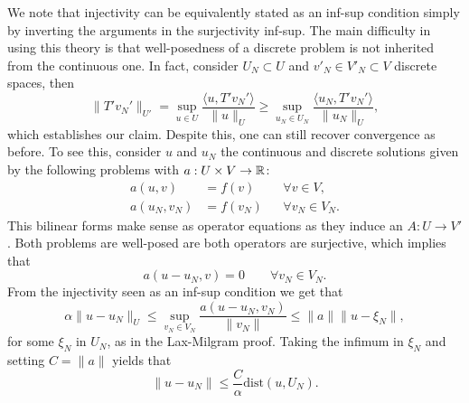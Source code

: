 We note that injectivity can be equivalently stated as an inf-sup condition simply by inverting the arguments in the surjectivity inf-sup.  The main difficulty in using this theory is that well-posedness of a discrete problem is not inherited from the continuous one. In fact, consider $U_N\subset U$ and $v'_N\in V'_N\subset V$ discrete spaces, then 
\begin{equation*}
    \|T'v_N'\|_{U'} = \sup_{u\in U}\frac{\langle u, T'v_N'\rangle}{\|u\|_U} \geq \sup_{u_N\in U_N}\frac{\langle u_N, T'v_N'\rangle}{\|u_N\|_U},
\end{equation*}
which establishes our claim. Despite this, one can still recover convergence as before. To see this, consider $u$ and $u_N$ the continuous and discrete solutions given by the following problems with $a:U\times V \to \mathbb{R}$:
\begin{equation*}
    \begin{aligned}
        a(u,v) &= f(v) &&\forall v\in V,\\
        a(u_N, v_N) &= f(v_N) &&\forall v_N\in V_N.
    \end{aligned}
\end{equation*}
This bilinear forms make sense as operator equations as they induce an $A:U\to V'$. Both problems are well-posed are both operators are surjective, which implies that 
\begin{equation*}
    a(u-u_N, v) = 0  \qquad \forall v_N \in V_N.
\end{equation*}
From the injectivity seen as an inf-sup condition we get that
\begin{equation*}
    \alpha \| u - u_N \|_U \leq \sup_{v_N\in V_N} \frac{a(u-u_N, v_N)}{\|v_N\|} \leq \| a \| \|u - \xi_N \|,
\end{equation*}
for some $\xi_N$ in $U_N$, as in the Lax-Milgram proof. Taking the infimum in $\xi_N$ and setting $C=\|a\|$ yields that
\begin{equation*}
    \| u - u_N \| \leq \frac{C}{\alpha}\text{dist}(u, U_N).
\end{equation*}
